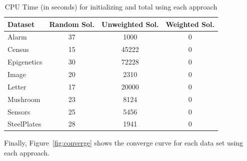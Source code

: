 	\begin{table}[ h ]
		\centering
		\begin{tabular}{ | l | c | c | c | }
			\hline
			Dataset & Random Sol. & Unweighted Sol. & Weighted Sol.\\ \hline
			Alarm & 37 & 1000 & 0 \\ \hline
			Census & 15 & 45222 & 0 \\ \hline
			Epigenetics & 30 & 72228 & 0 \\ \hline
			Image & 20 & 2310 & 0 \\ \hline
			Letter & 17 & 20000 & 0 \\ \hline
			Mushroom & 23 & 8124 & 0 \\ \hline
			Sensors & 25 & 5456 & 0 \\ \hline
			SteelPlates & 28 & 1941 & 0 \\ \hline
		\end{tabular}
		\caption{CPU Time (in seconds) for initializing and total using each approach}
		\label{tab:times}
	\end{table}
	Finally, Figure~\ref{fig:converge} shows the converge curve for each data set using each approach.

